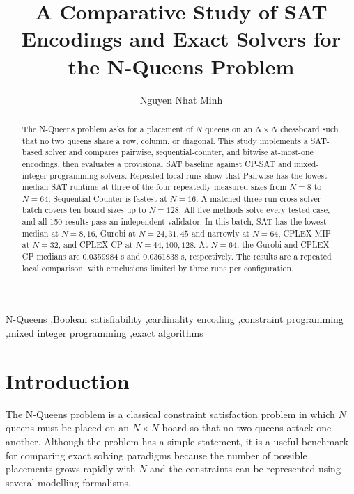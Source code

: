 \documentclass[a4paper,fleqn]{cas-sc}
\begin{document}

\title[mode = title]{A Comparative Study of SAT Encodings and Exact Solvers for the N-Queens Problem}

\author[1]{Nguyen Nhat Minh}
\cormark[1]

\address[1]{Faculty of Information Technology, VNU University of Engineering and Technology, Vietnam National University, Hanoi, Vietnam}


\begin{abstract}
The N-Queens problem asks for a placement of $N$ queens on an $N \times N$ chessboard such that no two queens share a row, column, or diagonal. This study implements a SAT-based solver and compares pairwise, sequential-counter, and bitwise at-most-one encodings, then evaluates a provisional SAT baseline against CP-SAT and mixed-integer programming solvers. Repeated local runs show that Pairwise has the lowest median SAT runtime at three of the four repeatedly measured sizes from $N=8$ to $N=64$; Sequential Counter is fastest at $N=16$. A matched three-run cross-solver batch covers ten board sizes up to $N=128$. All five methods solve every tested case, and all 150 results pass an independent validator. In this batch, SAT has the lowest median at $N=8,16$, Gurobi at $N=24,31,45$ and narrowly at $N=64$, CPLEX MIP at $N=32$, and CPLEX CP at $N=44,100,128$. At $N=64$, the Gurobi and CPLEX CP medians are 0.0359984 s and 0.0361838 s, respectively. The results are a repeated local comparison, with conclusions limited by three runs per configuration.
\end{abstract}

\begin{keywords}
N-Queens \sep Boolean satisfiability \sep cardinality encoding \sep constraint programming \sep mixed integer programming \sep exact algorithms
\end{keywords}

\maketitle

\section{Introduction}

The N-Queens problem is a classical constraint satisfaction problem in which $N$ queens must be placed on an $N \times N$ board so that no two queens attack one another. Although the problem has a simple statement, it is a useful benchmark for comparing exact solving paradigms because the number of possible placements grows rapidly with $N$ and the constraints can be represented using several modelling formalisms.
\end{document}
